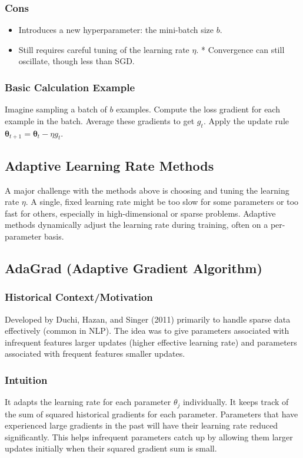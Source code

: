 \documentclass{article}
\newcommand{\btheta}{\bm{\theta}}
\begin{document}
\subsubsection{Cons}
\begin{itemize}
    \item Introduces a new hyperparameter: the mini-batch size $b$.
    \item Still requires careful tuning of the learning rate $\eta$.
    * Convergence can still oscillate, though less than SGD.
\end{itemize}

\subsubsection{Basic Calculation Example}
Imagine sampling a batch of $b$ examples. Compute the loss gradient for each example in the batch. Average these gradients to get $g_t$. Apply the update rule $\btheta_{t+1} = \btheta_t - \eta g_t$.

\subsection{Adaptive Learning Rate Methods}
A major challenge with the methods above is choosing and tuning the learning rate $\eta$. A single, fixed learning rate might be too slow for some parameters or too fast for others, especially in high-dimensional or sparse problems. Adaptive methods dynamically adjust the learning rate during training, often on a per-parameter basis.

\subsection{AdaGrad (Adaptive Gradient Algorithm)}

\subsubsection{Historical Context/Motivation}
Developed by Duchi, Hazan, and Singer (2011) primarily to handle sparse data effectively (common in NLP). The idea was to give parameters associated with infrequent features larger updates (higher effective learning rate) and parameters associated with frequent features smaller updates.

\subsubsection{Intuition}
It adapts the learning rate for each parameter $\theta_j$ individually. It keeps track of the sum of squared historical gradients for each parameter. Parameters that have experienced large gradients in the past will have their learning rate reduced significantly. This helps infrequent parameters catch up by allowing them larger updates initially when their squared gradient sum is small.
\end{document}
